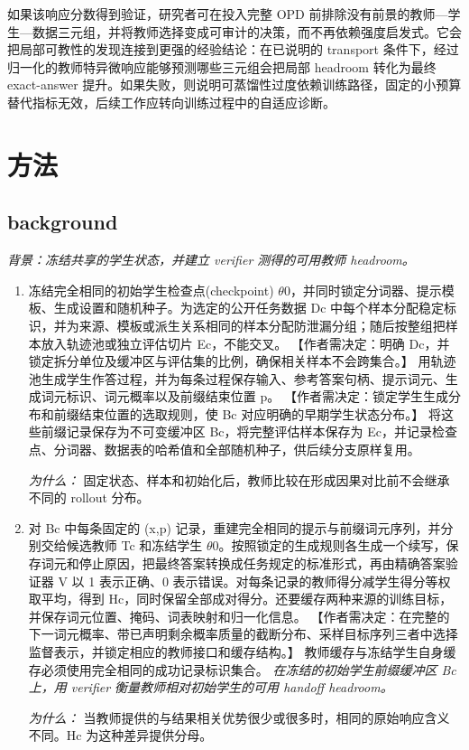 \documentclass[10pt,a4paper]{article}
\begin{document}
如果该响应分数得到验证，研究者可在投入完整 OPD 前排除没有前景的教师---学生---数据三元组，并将教师选择变成可审计的决策，而不再依赖强度启发式。它会把局部可教性的发现连接到更强的经验结论：在已说明的 transport 条件下，经过归一化的教师特异微响应能够预测哪些三元组会把局部 headroom 转化为最终 exact-answer 提升。如果失败，则说明可蒸馏性过度依赖训练路径，固定的小预算替代指标无效，后续工作应转向训练过程中的自适应诊断。
\section*{方法}
\subsection*{background}
\emph{背景：冻结共享的学生状态，并建立 verifier 测得的可用教师 headroom。}
\begin{enumerate}[leftmargin=*,start=1]
  \item 冻结完全相同的初始学生检查点(checkpoint) \(\theta 0\)，并同时锁定分词器、提示模板、生成设置和随机种子。为选定的公开任务数据 Dc 中每个样本分配稳定标识，并为来源、模板或派生关系相同的样本分配防泄漏分组；随后按整组把样本放入轨迹池或独立评估切片 Ec，不能交叉。 【作者需决定：明确 Dc，并锁定拆分单位及缓冲区与评估集的比例，确保相关样本不会跨集合。】 用轨迹池生成学生作答过程，并为每条过程保存输入、参考答案句柄、提示词元、生成词元标识、词元概率以及前缀结束位置 p。 【作者需决定：锁定学生生成分布和前缀结束位置的选取规则，使 Bc 对应明确的早期学生状态分布。】 将这些前缀记录保存为不可变缓冲区 Bc，将完整评估样本保存为 Ec，并记录检查点、分词器、数据表的哈希值和全部随机种子，供后续分支原样复用。
\par\emph{为什么：} 固定状态、样本和初始化后，教师比较在形成因果对比前不会继承不同的 rollout 分布。
  \item 对 Bc 中每条固定的 (x,p) 记录，重建完全相同的提示与前缀词元序列，并分别交给候选教师 Tc 和冻结学生 \(\theta 0\)。按照锁定的生成规则各生成一个续写，保存词元和停止原因，把最终答案转换成任务规定的标准形式，再由精确答案验证器 V 以 1 表示正确、0 表示错误。对每条记录的教师得分减学生得分等权取平均，得到 Hc，同时保留全部成对得分。还要缓存两种来源的训练目标，并保存词元位置、掩码、词表映射和归一化信息。 【作者需决定：在完整的下一词元概率、带已声明剩余概率质量的截断分布、采样目标序列三者中选择监督表示，并锁定相应的教师接口和缓存结构。】 教师缓存与冻结学生自身缓存必须使用完全相同的成功记录标识集合。
\noindent\emph{在冻结的初始学生前缀缓冲区 Bc 上，用 verifier 衡量教师相对初始学生的可用 handoff headroom。}
\par{}
\par\emph{为什么：} 当教师提供的与结果相关优势很少或很多时，相同的原始响应含义不同。Hc 为这种差异提供分母。
\end{enumerate}
\end{document}
